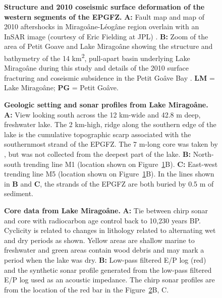\documentclass[linenumbers,draft]{agujournal}
\begin{document}
\begin{figure}
\centering
\caption{\textbf{Structure and 2010 coseismic surface deformation of the western segments of the EPGFZ.} \textbf{A:} Fault map \citep{prentice2010seismic,cowgill2012interactive} and map of 2010 aftershocks \citep{douilly2013crustal} in Mirago\^ane-L\'eog\^ane region overlain with an InSAR image (courtesy of Eric Fielding at JPL) \citep{hayes2010complex}. \textbf{B:} Zoom of the area of Petit Goave and Lake Mirago\^ane showing the structure and bathymetry of the 14 km\textsuperscript{2}, pull-apart basin underlying Lake Mirago\^ane during this study and details of the 2010 surface fracturing and coseismic subsidence in the Petit Go\^ave Bay \citep{prentice2010seismic,hornbach2010high}. \textbf{LM} = Lake Mirago\^ane; \textbf{PG} = Petit Go\^ave.}
\label{figure7}
\end{figure}

\begin{figure}
\centering
\caption{\textbf{Geologic setting and sonar profiles from Lake Mirago\^ane.} \textbf{A:} View looking south across the 12 km-wide and 42.8 m deep, freshwater lake. The 2 km-high, ridge along the southern edge of the lake is the cumulative topographic scarp associated with the southernmost strand of the EPGFZ. The 7 m-long core was taken by \citet{higuera199910}, but was not collected from the deepest part of the lake. \textbf{B:} North-south trending line M1 (location shown on Figure~\ref{figure7}B). \textbf{C:} East-west trending line M5 (location shown on Figure~\ref{figure7}B). In the lines shown in \textbf{B} and \textbf{C}, the strands of the EPGFZ are both buried by 0.5 m of sediment.}
\label{figure8}
\end{figure}

\begin{figure}
\centering
\caption{\textbf{Core data from Lake Mirago\^ane.} \textbf{A:} Tie between chirp sonar and core with radiocarbon age control back to 10,230 years BP. \citep{higuera199910} Cyclicity is related to changes in lithology related to alternating wet and dry periods as shown. Yellow areas are shallow marine to freshwater and green areas contain wood debris and may mark a period when the lake was dry. \textbf{B:} Low-pass filtered E/P log (red) and the synthetic sonar profile generated from the low-pass filtered E/P log used as an acoustic impedance. The chirp sonar profiles are from the location of the red bar in the Figure~\ref{figure8}B, C.}
\label{figure9}
\end{figure}
\end{document}
